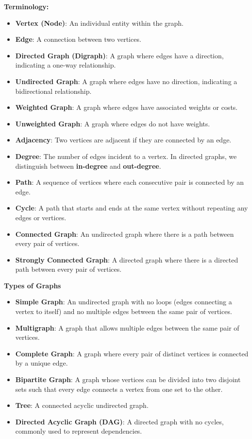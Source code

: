 \textbf{Terminology:}
\begin{itemize}
    \item \textbf{Vertex (Node)}: An individual entity within the graph.
    \item \textbf{Edge}: A connection between two vertices.
    \item \textbf{Directed Graph (Digraph)}: A graph where edges have a direction, indicating a one-way relationship.
    \item \textbf{Undirected Graph}: A graph where edges have no direction, indicating a bidirectional relationship.
    \item \textbf{Weighted Graph}: A graph where edges have associated weights or costs.
    \item \textbf{Unweighted Graph}: A graph where edges do not have weights.
    \item \textbf{Adjacency}: Two vertices are adjacent if they are connected by an edge.
    \item \textbf{Degree}: The number of edges incident to a vertex. In directed graphs, we distinguish between \textbf{in-degree} and \textbf{out-degree}.
    \item \textbf{Path}: A sequence of vertices where each consecutive pair is connected by an edge.
    \item \textbf{Cycle}: A path that starts and ends at the same vertex without repeating any edges or vertices.
    \item \textbf{Connected Graph}: An undirected graph where there is a path between every pair of vertices.
    \item \textbf{Strongly Connected Graph}: A directed graph where there is a directed path between every pair of vertices.
\end{itemize}

\textbf{Types of Graphs}

\begin{itemize}
    \item \textbf{Simple Graph}: An undirected graph with no loops (edges connecting a vertex to itself) and no multiple edges between the same pair of vertices.
    \item \textbf{Multigraph}: A graph that allows multiple edges between the same pair of vertices.
    \item \textbf{Complete Graph}: A graph where every pair of distinct vertices is connected by a unique edge.
    \item \textbf{Bipartite Graph}: A graph whose vertices can be divided into two disjoint sets such that every edge connects a vertex from one set to the other.
    \item \textbf{Tree}: A connected acyclic undirected graph.
    \item \textbf{Directed Acyclic Graph (DAG)}: A directed graph with no cycles, commonly used to represent dependencies.
\end{itemize}

